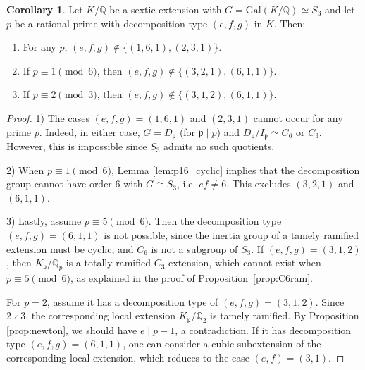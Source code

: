\documentclass[letterpaper, 10pt]{article}
\newcommand{\Gal}{\mathrm{Gal}}
\newcommand{\bQ}{\mathbb{Q}}
\newcommand{\frp}{\mathfrak{p}}
\newcommand{\1}{\mathds{1}}	%
\theoremstyle{definition}
\newtheorem{corollary}[theorem]{Corollary}
\theoremstyle{remark}
\begin{document}
\begin{corollary}
    \label{cor:S3ram}
    Let $K / \bQ$ be a sextic extension with $G = \Gal(K / \bQ) \simeq S_3$ and let $p$ be a rational prime with decomposition type $(e, f, g)$ in $K$. Then: 
    \begin{enumerate}
        \item For any $p$, $(e, f, g) \not \in \{(1, 6, 1), (2, 3, 1)\}$.
        \item If $p \equiv 1 \pmod{6}$, then $(e, f, g) \not \in \{(3, 2, 1), (6, 1, 1)\}$.
        \item If $p \equiv 2 \pmod{3}$, then $(e, f, g) \not \in \{(3, 1, 2), (6, 1, 1)\}$.
    \end{enumerate}
\end{corollary}
\begin{proof}

1) The cases \( (e, f, g) = (1, 6, 1) \) and \( (2, 3, 1) \) cannot occur for any prime \( p \).  
Indeed, in either case,  \(G= D_\mathfrak{p} \) (for \( \mathfrak{p} \mid p \)) and \( D_\mathfrak{p} / I_\mathfrak{p} \simeq C_6 \) or \( C_3 \).  
However, this is impossible since \( S_3 \) admits no such quotients.


2) When $p \equiv 1 \pmod{6}$, Lemma \ref{lem:p16_cyclic} implies that the decomposition group cannot have order 6 with $G \cong S_3$, i.e. $ef \ne 6$. This excludes $(3, 2, 1)$ and $(6, 1, 1)$.

3) Lastly, assume \( p \equiv 5 \pmod{6} \).  
Then the decomposition type \( (e, f, g) = (6, 1, 1) \) is not possible, since the inertia group of a tamely ramified extension must be cyclic, and \( C_6 \) is not a subgroup of \( S_3 \).  
If \( (e, f, g) = (3, 1, 2) \), then \( K_\mathfrak{p} / \mathbb{Q}_p \) is a totally ramified \( C_3 \)-extension, which cannot exist when \( p \equiv 5 \pmod{6} \), as explained in the proof of Proposition~\ref{prop:C6ram}.

 For $p = 2$, assume it has a decomposition type of $(e, f, g) = (3, 1, 2)$.
Since $2 \nmid 3$, the corresponding local extension $K_\frp / \bQ_2$ is tamely ramified.
By Proposition \ref{prop:newton}, we should have $e \mid p - 1$, a contradiction.
If it has decomposition type $(e, f, g) = (6, 1, 1)$, one can consider a cubic subextension of the corresponding local extension, which reduces to the case $(e, f) = (3, 1)$.

\end{proof}
\end{document}
